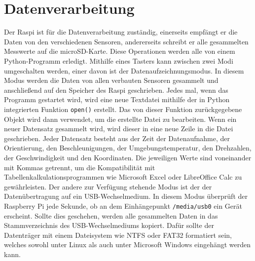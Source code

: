 \section{Datenverarbeitung}
\label{sec:Datenverarbeitung}
Der \ac{Raspi} ist für die Datenverarbeitung zuständig, einerseits empfängt er die Daten von den verschiedenen Sensoren, andererseits schreibt er alle gesammelten Messwerte auf die microSD-Karte. Diese Operationen werden alle von einem Python-Programm erledigt. Mithilfe eines Tasters kann zwischen zwei Modi umgeschalten werden, einer davon ist der Datenaufzeichnungsmodus. In diesem Modus werden die Daten von allen verbauten Sensoren gesammelt und anschließend auf den Speicher des \ac{Raspi} geschrieben. Jedes mal, wenn das Programm gestartet wird, wird eine neue Textdatei mithilfe der in Python integrierten Funktion \verb|open()| erstellt. Das von dieser Funktion zurückgegebene Objekt wird dann verwendet, um die erstellte Datei zu bearbeiten. Wenn ein neuer Datensatz gesammelt wird, wird dieser in eine neue Zeile in die Datei geschrieben. Jeder Datensatz besteht aus der Zeit der Datenaufnahme, der Orientierung, den Beschleunigungen, der Umgebungstemperatur, den Drehzahlen, der Geschwindigkeit und den Koordinaten. Die jeweiligen Werte sind voneinander mit Kommas getrennt, um die Kompatibilität mit Tabellenkalkulationsprogrammen wie Microsoft Excel oder LibreOffice Calc zu gewährleisten. Der andere zur Verfügung stehende Modus ist der der Datenübertragung auf ein \ac{USB}-Wechselmedium. In diesem Modus überprüft der Raspberry Pi jede Sekunde, ob an dem Einhängepunkt \verb|/media/usb0| ein Gerät erscheint. Sollte dies geschehen, werden alle gesammelten Daten in das Stammverzeichnis des \ac{USB}-Wechselmediums kopiert. Dafür sollte der Datenträger mit einem Dateisystem wie NTFS oder FAT32 formatiert sein, welches sowohl unter Linux als auch unter Microsoft Windows eingehängt werden kann. 